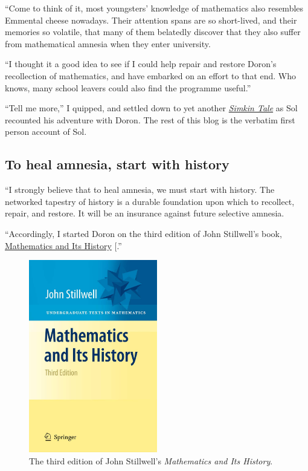 \documentclass[
  a4paper,
]{article}
\begin{document}
``Come to think of it, most youngsters' knowledge of mathematics also
resembles Emmental cheese nowadays. Their attention spans are so
short-lived, and their memories so volatile, that many of them belatedly
discover that they also suffer from mathematical amnesia when they enter
university.

``I thought it a good idea to see if I could help repair and restore
Doron's recollection of mathematics, and have embarked on an effort to
that end. Who knows, many school leavers could also find the programme
useful.''

``Tell me more,'' I quipped, and settled down to yet another
\href{https://swanlotus.netlify.app/tag/the-simkin-tales}{\emph{Simkin
Tale}} as Sol recounted his adventure with Doron. The rest of this blog
is the verbatim first person account of Sol.

\subsection{To heal amnesia, start with
history}\label{to-heal-amnesia-start-with-history}

``I strongly believe that to heal amnesia, we must start with history.
The networked tapestry of history is a durable foundation upon which to
recollect, repair, and restore. It will be an insurance against future
selective amnesia.

``Accordingly, I started Doron on the third edition of John Stillwell's
book,
\href{https://www.amazon.in/Mathematics-Its-History-Undergraduate-Texts/dp/144196052X}{Mathematics
and Its History} {[}\citeproc{ref-stillwell2010}{1}{]}.''

\begin{figure}
\centering
\includegraphics[width=0.5\textwidth,height=\textheight]{images/stillwell-history-third.jpg}
\caption{The third edition of John Stillwell's \emph{Mathematics and Its
History}.}\label{fig:stillwell}
\end{figure}
\end{document}
